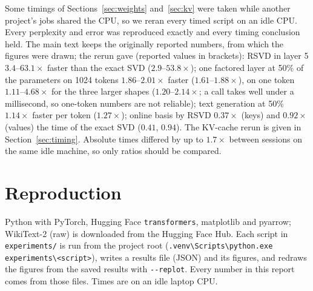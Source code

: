 \documentclass[10pt]{article}
\theoremstyle{plain}
\theoremstyle{definition}
\theoremstyle{remark}
\begin{document}
Some timings of Sections~\ref{sec:weights} and~\ref{sec:kv} were taken while another project's jobs shared the CPU, so we reran every timed script on an idle CPU. Every perplexity and error was reproduced exactly and every timing conclusion held. The main text keeps the originally reported numbers, from which the figures were drawn; the rerun gave (reported values in brackets): RSVD in layer 5 $3.4$--$63.1\times$ faster than the exact SVD ($2.9$--$53.8\times$); one factored layer at 50\% of the parameters on 1024 tokens $1.86$--$2.01\times$ faster ($1.61$--$1.88\times$), on one token $1.11$--$4.68\times$ for the three larger shapes ($1.20$--$2.14\times$; a call takes well under a millisecond, so one-token numbers are not reliable); text generation at 50\% $1.14\times$ faster per token ($1.27\times$); online basis by RSVD $0.37\times$ (keys) and $0.92\times$ (values) the time of the exact SVD ($0.41$, $0.94$). The KV-cache rerun is given in Section~\ref{sec:timing}. Absolute times differed by up to $1.7\times$ between sessions on the same idle machine, so only ratios should be compared.

\section{Reproduction}
\label{app:repro}

Python with PyTorch, Hugging Face \texttt{transformers}, matplotlib and pyarrow; WikiText-2 (raw) is downloaded from the Hugging Face Hub. Each script in \texttt{experiments/} is run from the project root (\verb|.venv\Scripts\python.exe experiments\<script>|), writes a results file (JSON) and its figures, and redraws the figures from the saved results with \verb|--replot|. Every number in this report comes from those files. Times are on an idle laptop CPU.
\end{document}

